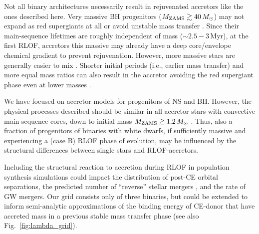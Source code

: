 \documentclass[twocolumn,twocolappendix,trackchanges]{aastex63}
\DeclareRobustCommand{\Figref}[1]{Fig.~\ref{#1}}
\begin{document}
Not all binary architectures necessarily result in rejuvenated
accretors like the ones described here. Very massive BH progenitors
($M_{\rm ZAMS}\gtrsim 40\,M_\odot$) may not expand as red supergiants
at all or avoid unstable mass transfer \citep[e.g.,][]{vanson:2021,
  marchant:2021}. Since their main-sequence lifetimes are roughly
independent of mass ($\sim{}2.5-3$\,Myr), at the first RLOF, accretors
this massive may already have a deep core/envelope chemical gradient
to prevent rejuvenation.
However,
more massive stars are generally easier to mix \citep[including
reaching rotationally-induced chemically homogeneous evolution,
e.g.,][]{yoon:2005, demink:2016}. Shorter initial periods (i.e.,
earlier mass transfer) and more equal mass ratios can also result in
the accretor avoiding the red supergiant phase even at lower masses
\citep{cantiello:2007}.

We have focused on accretor models for progenitors of NS and BH. However,
the physical processes described should be similar in all accretor
stars with convective main sequence cores, down to initial mass
$M_{\rm ZAMS}\gtrsim 1.2\,M_\odot$ \citep[see also][]{wang:20}. Thus,
also a fraction of progenitors of binaries with white dwarfs, if
sufficiently massive and experiencing a (case B) RLOF phase of
evolution, may be influenced by the structural differences between
single stars and RLOF-accretors.

Including the structural reaction to accretion during RLOF in
population synthesis simulations could impact the distribution of
post-CE orbital separations, the predicted number of ``reverse''
stellar mergers \citep[e.g.,][]{zapartas:2017}, and the rate of GW
mergers. Our grid consists only of three binaries, but could be
extended to inform semi-analytic approximations of the binding energy
of CE-donor that have accreted mass in a previous stable mass transfer
phase (see also \Figref{fig:lambda_grid}).

\end{document}
